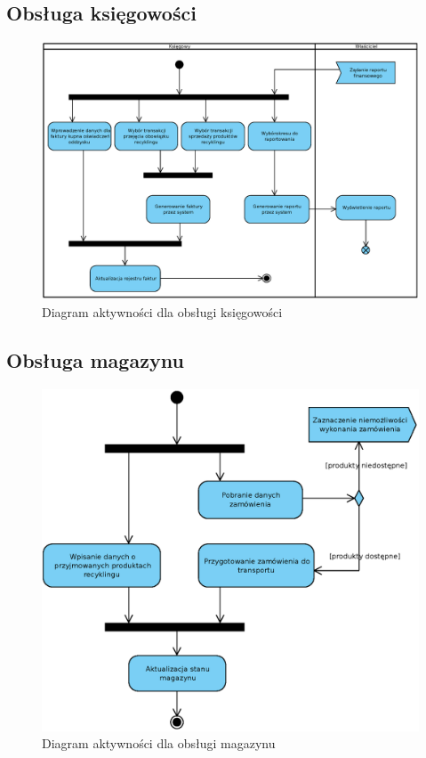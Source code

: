 \subsection{Obsługa księgowości}
	\begin{figure}[H]
		\centering
		\centerline{\includegraphics[width=1.2\textwidth]{img/AD/ksiegowosc.eps}}
		\caption{Diagram aktywności dla obsługi księgowości}
	\end{figure}

\subsection{Obsługa magazynu}
	\begin{figure}[H]
		\centering
		\includegraphics[width=.9\textwidth]{img/AD/magazyn.eps}
		\caption{Diagram aktywności dla obsługi magazynu}
	\end{figure}

